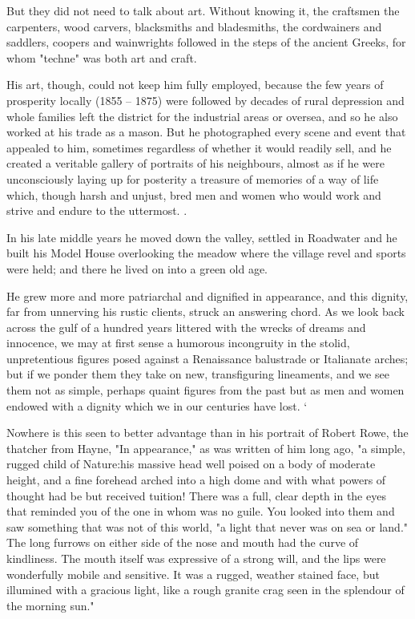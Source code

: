 But they did not need to talk about art. Without knowing it, the craftsmen   the carpenters, wood carvers, blacksmiths and bladesmiths, the cordwainers and saddlers, coopers and wainwrights   followed in the steps of the ancient Greeks, for whom "techne" was both art and craft.

His art, though, could not keep him fully employed, because the few years of prosperity locally (1855 – 1875) were followed by decades of rural depression and whole families left the district for the industrial areas or oversea, and so he also worked at his trade as a mason. But he photographed every scene and event that appealed to him, sometimes regardless of whether it would readily sell, and he created a veritable gallery of portraits of his neighbours, almost as if he were unconsciously laying up for posterity a treasure of memories of a way of life which, though harsh and unjust, bred men and women who would work and strive and endure to the uttermost. .

In his late middle years he moved down the valley, settled in Roadwater and he built his Model House overlooking the meadow where the village revel and sports were held; and there he lived on into a green old age.

He grew more and more patriarchal and dignified in appearance, and this dignity, far from unnerving his rustic clients, struck an answering chord. As we look back across the gulf of a hundred years littered with the wrecks of dreams and innocence, we may at first sense a humorous incongruity in the stolid, unpretentious figures posed against a Renaissance balustrade or Italianate arches; but if we ponder them they take on new, transfiguring lineaments, and we see them not as simple, perhaps quaint figures from the past but as men and women endowed with a dignity which we in our centuries have lost. `

Nowhere is this seen to better advantage than in his portrait of Robert Rowe, the thatcher from Hayne, "In appearance," as was written of him long ago, "a simple, rugged child of Nature:his massive head well poised on a body of moderate height, and a fine forehead arched into a high dome   and with what powers of thought had be but received tuition! There was a full, clear depth in the eyes that reminded you of the one in whom was no guile. You looked into them and saw something that was not of this world, "a light that never was on sea or land." The long furrows on either side of the nose and mouth had the curve of kindliness. The mouth itself was expressive of a strong will, and the lips were wonderfully mobile and sensitive. It was a rugged, weather stained face, but illumined with a gracious light, like a rough granite crag seen in the splendour of the morning sun." 

